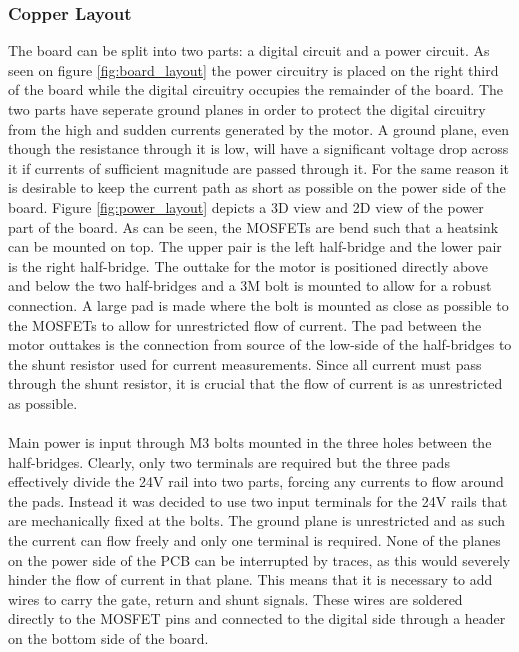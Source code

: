 \subsubsection{Copper Layout} %
\label{ssub:copper_layout}
The board can be split into two parts: a digital circuit and a power circuit.
As seen on figure \ref{fig:board_layout} the power circuitry is placed on the right third of the board while the digital circuitry occupies the remainder of the board.
The two parts have seperate ground planes in order to protect the digital circuitry from the high and sudden currents generated by the motor.
A ground plane, even though the resistance through it is low, will have a significant voltage drop across it if currents of sufficient magnitude are passed through it.
For the same reason it is desirable to keep the current path as short as possible on the power side of the board.
Figure \ref{fig:power_layout} depicts a 3D view and 2D view of the power part of the board.
As can be seen, the MOSFETs are bend such that a heatsink can be mounted on top.
The upper pair is the left half-bridge and the lower pair is the right half-bridge.
The outtake for the motor is positioned directly above and below the two half-bridges and a 3M bolt is mounted to allow for a robust connection.
A large pad is made where the bolt is mounted as close as possible to the MOSFETs to allow for unrestricted flow of current.
The pad between the motor outtakes is the connection from source of the low-side of the half-bridges to the shunt resistor used for current measurements.
Since all current must pass through the shunt resistor, it is crucial that the flow of current is as unrestricted as possible.
\\~\\
Main power is input through M3 bolts mounted in the three holes between the half-bridges.
Clearly, only two terminals are required but the three pads effectively divide the 24V rail into two parts, forcing any currents to flow around the pads.
Instead it was decided to use two input terminals for the 24V rails that are mechanically fixed at the bolts.
The ground plane is unrestricted and as such the current can flow freely and only one terminal is required.
None of the planes on the power side of the PCB can be interrupted by traces, as this would severely hinder the flow of current in that plane.
This means that it is necessary to add wires to carry the gate, return and shunt signals.
These wires are soldered directly to the MOSFET pins and connected to the digital side through a header on the bottom side of the board. 

